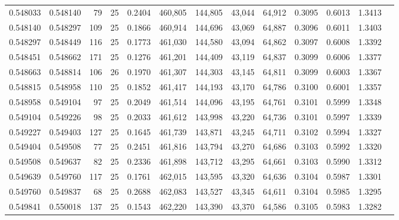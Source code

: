 \begin{tabular}{rrrrrrrrrrrrr}
0.548033 & 0.548140 &    79 &  25 &                                     0.2404 & 460,805 & 144,805 &  43,044 &  64,912 & 0.3095 & 0.6013 & 1.3413 \\
0.548140 & 0.548297 &   109 &  25 &                                     0.1866 & 460,914 & 144,696 &  43,069 &  64,887 & 0.3096 & 0.6011 & 1.3403 \\
0.548297 & 0.548449 &   116 &  25 &                                     0.1773 & 461,030 & 144,580 &  43,094 &  64,862 & 0.3097 & 0.6008 & 1.3392 \\
0.548451 & 0.548662 &   171 &  25 &                                     0.1276 & 461,201 & 144,409 &  43,119 &  64,837 & 0.3099 & 0.6006 & 1.3377 \\
0.548663 & 0.548814 &   106 &  26 &                                     0.1970 & 461,307 & 144,303 &  43,145 &  64,811 & 0.3099 & 0.6003 & 1.3367 \\
0.548815 & 0.548958 &   110 &  25 &                                     0.1852 & 461,417 & 144,193 &  43,170 &  64,786 & 0.3100 & 0.6001 & 1.3357 \\
0.548958 & 0.549104 &    97 &  25 &                                     0.2049 & 461,514 & 144,096 &  43,195 &  64,761 & 0.3101 & 0.5999 & 1.3348 \\
0.549104 & 0.549226 &    98 &  25 &                                     0.2033 & 461,612 & 143,998 &  43,220 &  64,736 & 0.3101 & 0.5997 & 1.3339 \\
0.549227 & 0.549403 &   127 &  25 &                                     0.1645 & 461,739 & 143,871 &  43,245 &  64,711 & 0.3102 & 0.5994 & 1.3327 \\
0.549404 & 0.549508 &    77 &  25 &                                     0.2451 & 461,816 & 143,794 &  43,270 &  64,686 & 0.3103 & 0.5992 & 1.3320 \\
0.549508 & 0.549637 &    82 &  25 &                                     0.2336 & 461,898 & 143,712 &  43,295 &  64,661 & 0.3103 & 0.5990 & 1.3312 \\
0.549639 & 0.549760 &   117 &  25 &                                     0.1761 & 462,015 & 143,595 &  43,320 &  64,636 & 0.3104 & 0.5987 & 1.3301 \\
0.549760 & 0.549837 &    68 &  25 &                                     0.2688 & 462,083 & 143,527 &  43,345 &  64,611 & 0.3104 & 0.5985 & 1.3295 \\
0.549841 & 0.550018 &   137 &  25 &                                     0.1543 & 462,220 & 143,390 &  43,370 &  64,586 & 0.3105 & 0.5983 & 1.3282 \\

\end{tabular}
